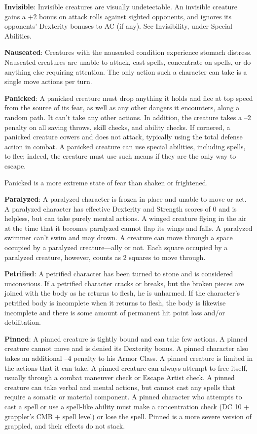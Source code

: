 \textbf{Invisible}: Invisible creatures are visually undetectable. An invisible creature gains a +2 bonus on attack rolls against sighted opponents, and ignores its opponents' Dexterity bonuses to AC (if any). See Invisibility, under Special Abilities.
				
\textbf{Nauseated}: Creatures with the nauseated condition experience stomach distress. Nauseated creatures are unable to attack, cast spells, concentrate on spells, or do anything else requiring attention. The only action such a character can take is a single move actions per turn.
				
\textbf{Panicked}: A panicked creature must drop anything it holds and flee at top speed from the source of its fear, as well as any other dangers it encounters, along a random path. It can't take any other actions. In addition, the creature takes a --2 penalty on all saving throws, skill checks, and ability checks. If cornered, a panicked creature cowers and does not attack, typically using the total defense action in combat. A panicked creature can use special abilities, including spells, to flee; indeed, the creature must use such means if they are the only way to escape.
				
Panicked is a more extreme state of fear than shaken or frightened.
				
\textbf{Paralyzed}: A paralyzed character is frozen in place and unable to move or act. A paralyzed character has effective Dexterity and Strength scores of 0 and is helpless, but can take purely mental actions. A winged creature flying in the air at the time that it becomes paralyzed cannot flap its wings and falls. A paralyzed swimmer can't swim and may drown. A creature can move through a space occupied by a paralyzed creature---ally or not. Each square occupied by a paralyzed creature, however, counts as 2 squares to move through.
				
\textbf{Petrified}: A petrified character has been turned to stone and is considered unconscious. If a petrified character cracks or breaks, but the broken pieces are joined with the body as he returns to flesh, he is unharmed. If the character's petrified body is incomplete when it returns to flesh, the body is likewise incomplete and there is some amount of permanent hit point loss and/or debilitation.
				
\textbf{Pinned}: A pinned creature is tightly bound and can take few actions. A pinned creature cannot move and is denied its Dexterity bonus. A pinned character also takes an additional --4 penalty to his Armor Class. A pinned creature is limited in the actions that it can take. A pinned creature can always attempt to free itself, usually through a combat maneuver check or Escape Artist check. A pinned creature can take verbal and mental actions, but cannot cast any spells that require a somatic or material component. A pinned character who attempts to cast a spell or use a spell-like ability must make a concentration check (DC 10 + grappler's CMB + spell level) or lose the spell. Pinned is a more severe version of grappled, and their effects do not stack.
				
